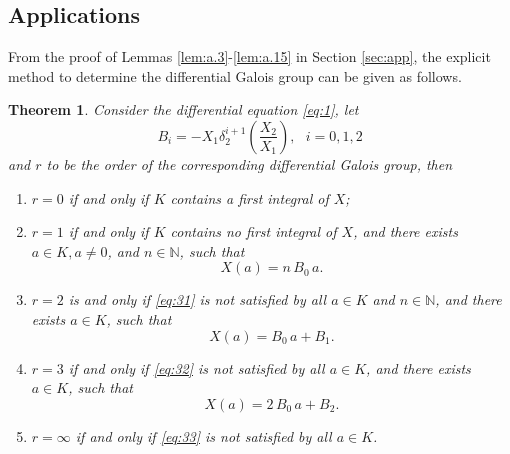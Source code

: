\documentclass[preprint, 12pt]{elsarticle}
\newtheorem{thm}{Theorem}[section]
\numberwithin{equation}{section}
\begin{document}
\subsection{Applications}

From the proof of Lemmas \ref{lem:a.3}-\ref{lem:a.15} in Section \ref{sec:app}, the explicit
method to determine the differential Galois group can be given as follows.
\begin{thm}
\label{th:2}Consider the differential equation \eqref{eq:1}, let
\begin{equation}
\label{eq:Bi}
B_i = -X_1\delta_2^{i+1}(\frac{X_2}{X_1}),\  \ \ i = 0,1,2
\end{equation}
and $r$ to be the order of the corresponding differential Galois
group, then
\begin{enumerate}
\item[(1).] $r=0$ if and only if $K$ contains a first integral of $X$; 
\item[(2).] $r=1$ if and only if $K$ contains no first integral of $X$, and there exists $a\in K, a\not=0$, and $n\in
\mathbb{N}$, such that
\begin{equation}
\label{eq:31} X(a) = n\,B_0\,a.
\end{equation}
 \item[(3).] $r=2$ is and only if \eqref{eq:31} is not satisfied by all $a\in K$ and $n\in \mathbb{N}$, and there exists
$a\in K$, such that 
\begin{equation} 
\label{eq:32} 
X(a) = B_0\,a + B_1.
\end{equation}
 \item[(4).] $r=3$ if and only if \eqref{eq:32} is not satisfied by all $a\in K$, and there exists $a\in K$, such that
\begin{equation}
\label{eq:33} X(a) = 2\,B_0\,a +  B_2. 
\end{equation}
 \item[(5).] $r=\infty$ if and only if \eqref{eq:33} is not satisfied by all $a\in K$.
\end{enumerate}
\end{thm}
\end{document}
